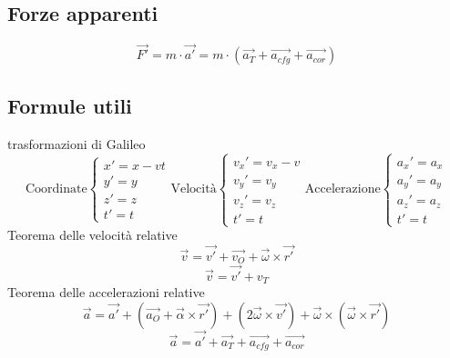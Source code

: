 \documentclass[twoside]{article}
\begin{document}
\subsection{Forze apparenti}
\begin{equation}
  \boxed{\vec{F'} = m \cdot \vec{a'} = m \cdot \left( \vec{a_T} + \vec{a_{cfg}}+ \vec{a_{cor}}\right)}
\end{equation}
\subsection{Formule utili}
trasformazioni di Galileo
\begin{equation*}
  \boxed{
    \text{Coordinate}
    \begin{cases}
      x' = x - vt \\
      y' = y      \\
      z' = z      \\
      t' = t
    \end{cases}
    \text{Velocità}
    \begin{cases}
      v_x' = v_x - v \\
      v_y' = v_y     \\
      v_z' = v_z     \\
      t' = t
    \end{cases}
    \text{Accelerazione}
    \begin{cases}
      a_x' = a_x \\
      a_y' = a_y \\
      a_z' = a_z \\
      t' = t
    \end{cases}
  }
\end{equation*}
Teorema delle velocità relative
\begin{equation*}
  \boxed{\vec{v} = \vec{v'} + \vec{v_O} + \vec{\omega} \times \vec{r'}}
\end{equation*}
\begin{equation*}
  \boxed{\vec{v} = \vec{v'} + v_{T}}
\end{equation*}
Teorema delle accelerazioni relative
\begin{equation*}
  \boxed{\vec{a} = \vec{a'} + \left(\vec{a_O} + \vec{\alpha} \times \vec{r'}\right) + \left(2 \vec{\omega} \times \vec{v'}\right) + \vec{\omega} \times \left(\vec{\omega} \times \vec{r'}\right)}
\end{equation*}
\begin{equation*}
  \boxed{\vec{a} = \vec{a'} + \vec{a_T} + \vec{a_{cfg}} + \vec{a_{cor}}}
\end{equation*}
\end{document}
